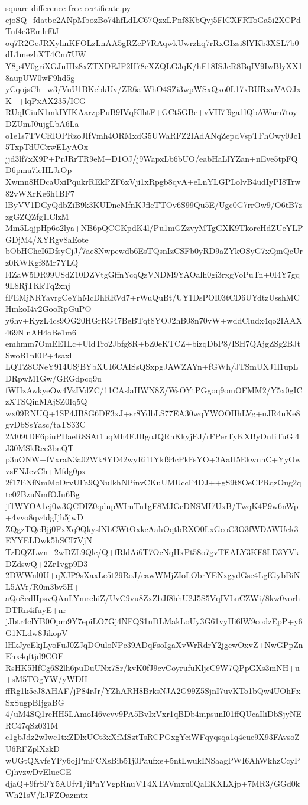 \documentclass[11pt]{article}
\theoremstyle{definition}
\theoremstyle{remark}
\begin{document}
\begin{filecontents*}[overwrite]{square-difference-free-certificate.py}
cjoSQ+fdatbe2ANpMbozBo74hfLdLC67QzxLPnf8KbQvj5FlCXFRToGa5i2XCPdTnf4e3Emlrf0J
oq7R2GeJRXyhnKFOLzLnAA5gRZcP7RAqwkUwrzhq7rRxGIzsi8lYKb3XSL7b0dL1mezhXT4Cm7UW
Y8p4V0griXGJuIHz8xZTXDEJF2H78eXZQLG3qK/hF18ISJcR8BqIV9IwBlyXX18aupUW0wF9hd5g
yCqojsCh+w3/VuU1BKebkUv/ZR6aiWhO4SZi3wpWSxQxo0L17xBURxnVAOJxK++lqPxAX235/ICG
RUqICiuN1mkIYIKAarzpPuB9IVqKlhtF+GCt5GBe+vVH7f9ga1lQbAWam7toyDZUmJ0ujgLbA6La
o1e1s7TVCRlOPRzoJIfVmh4ORMxdG5UWaRFZ2IAdANqZepdVspTFhOwy0Jc15TxpTdUCxwELyAOx
jjd3lf7xX9P+PrJRrTR9eM+D1OJ/j9WapxLb6bUO/eabHaLlYZan+nEve5tpFQD6pmu7leHLJrOp
Xwmn8HDcaUxiPqukrREkPZF6xVji1xRpgb8qvA+eLnYLGPLolvB4udIyPI8Trw82vWXrKe6h1BF7
lByVV1DGyQdbZiB9k3KUDncMfnKJfleTTOv6S99Qu5E/Ugc0G7rrOw9/O6tB7zzgGZQZfg1lClzM
Mm5LqjpHp6o2lya+NB6pQCGKpdK4l/Pu1mGZzvyMTgGXK9TkorcHdZUeYLPGDjM4/XYRgv8aEote
bObHCheI6DfsyCjJ/7ae8Nwpewdb6EsTQsnIzCSFb0yRD9aZYkOSyG7xQmQcUrz0KWKgf8Mr7YLQ
l4ZaW5DR99USdZ10DZVtgGffnYcqQzVNDM9YAOalh0gi3rxgVoPuTn+0I4Y7gq9L8RjTKkTq2xnj
fFEMjNRYavrgCeYhMcDhRRVd7+rWuQuBt/UY1DsPOI03tCD6UYdtzUsshMCHmkoI4v2GooRpGuPO
y6hv+KyzL4cs9OG20HGrRG47BeBTqt8YOJ2hB08n70vW+wddCludx4qo2IAAX469NlnAH4oBe1m6
emhmm7OmEE1Lc+UldTro2Jbfg8R+bZ0eKTCZ+bizqDbP8/ISH7QAjgZSg2BJtSwoB1nI0P+4saxl
LQTZ8CNeY914USjBYbXUI6CAISsQSxpgJAWZAYn+fGWh/JTSmUXJ1l1upLDRpwM1Gw/GRGdpcq9u
fWHzAwkyeOw4VzIVdZC/11CAslaHWN8Z/WsOYtPGgoq9omOFMM2/Y5x0gICzXTSQinMAjSZ0Iq5Q
wx09RNUQ+1SP4JB8G6DF3xJ+sr8YdbLS77EA30wqYWOOHhLVg+uJR4nKe8gvDbSsYasc/taTS33C
2M09tDF6piuPHaeR8SAt1uqMh4FJHgoJQRnKkyjEJ/rFPerTyKXByDnIiTuGl4J30MSkRce3bnQT
p3uONW+fVxraN3a02Wk8YD42wyRi1tYkf94cPkFsYO+3AaH5EkwnnC+YyOwvsENJevCh+Mfdg0px
2f17ENfNmMoDrvUFa9QNulkhNPinvCKuUMUccF4DJ++gS9t8OeCPRqzOug2qtc02BzuNmfOJu6Bg
jf1WYOA1cj0w3QCDIZ0qdnpWImTn1gF8MJGcDNSMI7UxB/TwqK4P9w6nWp+4vvo8qv4dgIjh5jwD
ZQgzTQcBjj0FxXq9QkyslNbCWtOxkcAahOqtbRXO0LxGcoC3O3fWDAWUek3EYYELDwk5hSCI7VjN
TzDQZLwn+2wDZL9Qlc/Q+fRldAi6T7OcNqHxPt58o7gvTEALY3KF8LD3YVkDZdswQ+2Zr1vgp9D3
2DWWnl0U+qXJP9sXaxLc5t29RoJ/eawWMjZIoLObrYENxgydGse4LgfGybBiNL5AVr/R0m3bv5H+
aQoSedHpsvQAnLYmrehiZ/UvC9vu8ZxZbJf8hhU2J5S5VqIVLnCZWi/8kw0vorhDTRn4ifuyE+nr
jJbtr4clYB0Opm9Y7epiLO7Gj4NFQS1nDLMakLoUy3G61vyHi6lW9codzEpP+y6G1NLdw8JikopV
lHkJyeEkjLyoFuJ0ZJqDOuloNPc39ADqFsoIgaXvWrRdrY2jgcwOxvZ+NwGPpZnEhx4qftjd9COF
RsHK5HfCg6S2lh6puDuUNx7Sr/kvK0fJ9cvCoyrufuKljcC9W7QPpGXs3mNH+u+sM5TOgYW/yWDH
ffRg1k5eJ8AHAF/jP84rJr/YZhARH8BrksNJA2G99Z5SjnI7uvKTo1bQw4UOhFxSxSugpBIjgaBG
4/uM4SQ1reHH5LAmoI46vcvv9PA5BvIxVxr1qBDb4mpsunI01ffQUcaIliDbSjyNERC47qSz031M
e1gbJdz2wIwc1txZDlxUCt3xXfMSztTsRCPGxgYciWFqyqsqa1q4eue9X93FAvsoZU6RFZplXzkD
wUGtQXvfeYPy6ojPmFCXsBib51j0Paufxe+5ntLwukINSaagPWI6AhWkhzCcyPCjhvzwDvElucGE
djaQ+9frSFY5AUfv1/iPnYVgpRnuVT4XTAVmxu0QaEKXLXjp+7MR3/GGd0kWh21sV/kJFZOazmtx

\end{filecontents*}
\end{document}
